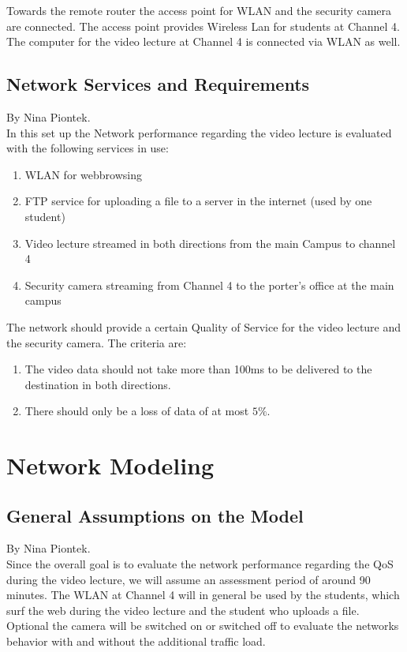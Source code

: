 \documentclass[a4paper,10pt]{book}\usepackage{graphicx}
\begin{document}
Towards the remote router the access point for WLAN and the security camera are connected.
The access point provides Wireless Lan for students at Channel 4. The computer for the video lecture at Channel 4 
is connected via WLAN as well.

\section{Network Services and Requirements}
By Nina Piontek.\\

In this set up the Network performance regarding the video lecture is evaluated with the following services in
use:\\
\begin{enumerate}
 \item WLAN for webbrowsing
 \item FTP service for uploading a file to a server in the internet (used by one student) 
 \item Video lecture streamed in both directions from the main Campus to channel 4
 \item Security camera streaming from Channel 4 to the porter's office  at the main campus
\end{enumerate}

The network should provide a certain Quality of Service for the video lecture and the security camera.
The criteria are:\\
\begin{enumerate}
 \item The video data should not take more than 100ms to be delivered to the destination in both directions.
 \item There should only be a loss of data of at most $5\%$.
\end{enumerate}

\chapter{Network Modeling}
\section{General Assumptions on the Model}
By Nina Piontek.\\

Since the overall goal is to evaluate the network performance regarding the QoS during the video lecture, we will assume an assessment period
of around 90 minutes. The WLAN at Channel 4 will in general be used by the students, which surf the web during the video lecture and the student 
who uploads a file. Optional the camera will be switched on or switched off to evaluate the networks behavior with and without the additional
traffic load.
\end{document}
